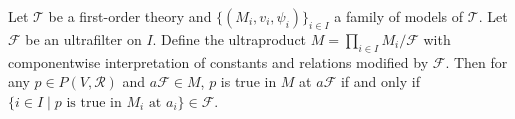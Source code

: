 Let $\mathcal{T}$ be a first-order theory and $\{(M_i, v_i, \psi_i)\}_{i \in I}$ a family of models of $\mathcal{T}$. Let $\mathcal{F}$ be an ultrafilter on $I$. Define the ultraproduct $M = \prod_{i \in I} M_i / \mathcal{F}$ with componentwise interpretation of constants and relations modified by $\mathcal{F}$. Then for any $p \in P(V, \mathcal{R})$ and $a\mathcal{F} \in M$, $p$ is true in $M$ at $a\mathcal{F}$ if and only if $\{i \in I \mid p \text{ is true in } M_i \text{ at } a_i\} \in \mathcal{F}$.
